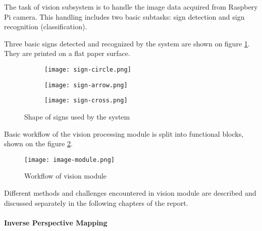 
The task of vision subsystem is to handle the image data acquired from Raspbery Pi camera. This handling includes two basic subtasks: sign detection and sign recognition (classification).

Three basic signs detected and recognized by the system are shown on figure \ref{fig:raw-signs}. They are printed on a flat paper surface.

\begin{figure}[th!]
	\centering
	\begin{subfigure}[b]{0.2\textwidth}
		\centering
		\texttt{[image: sign-circle.png]}
	\end{subfigure}
	\begin{subfigure}[b]{0.4\textwidth}
		\centering
		\texttt{[image: sign-arrow.png]}
	\end{subfigure}
	\begin{subfigure}[b]{0.2\textwidth}
		\centering
		\texttt{[image: sign-cross.png]}
	\end{subfigure}
	\caption{Shape of signs used by the system}
	\label{fig:raw-signs}
\end{figure}

Basic workflow of the vision processing module is split into functional blocks, shown on the figure \ref{fig:vision-module-blocks}.

\begin{figure}[th!]
	\centering
		\texttt{[image: image-module.png]}
	\caption{Workflow of vision module}
	\label{fig:vision-module-blocks}
\end{figure}

Different methods and challenges encountered in vision module are described and discussed separately in the following chapters of the report.
\paragraph{Inverse Perspective Mapping}

